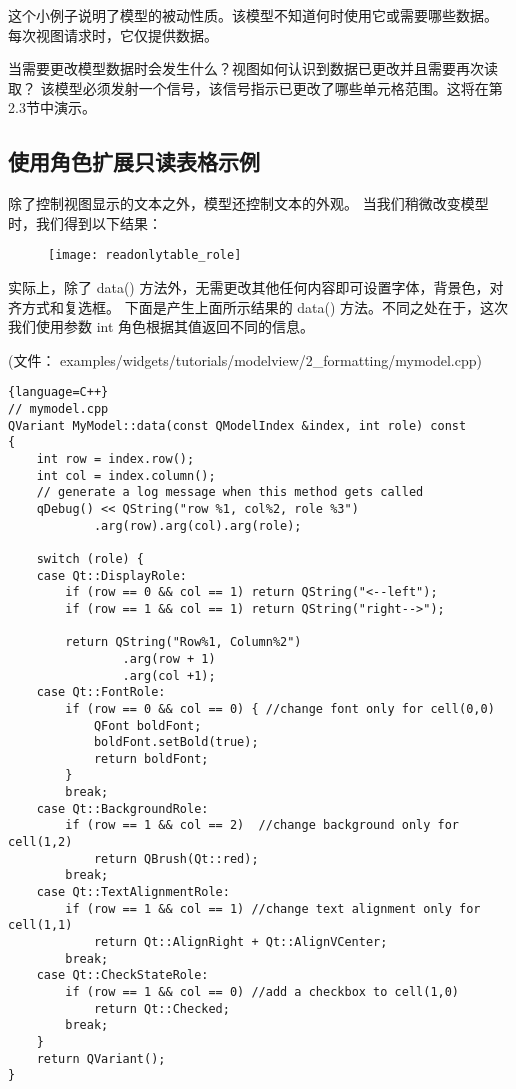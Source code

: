 这个小例子说明了模型的被动性质。该模型不知道何时使用它或需要哪些数据。
每次视图请求时，它仅提供数据。

当需要更改模型数据时会发生什么？视图如何认识到数据已更改并且需要再次读取？
该模型必须发射一个信号，该信号指示已更改了哪些单元格范围。这将在第2.3节中演示。

\subsection{使用角色扩展只读表格示例}

除了控制视图显示的文本之外，模型还控制文本的外观。
当我们稍微改变模型时，我们得到以下结果：

\begin{figure}[hbt!]  
\texttt{[image: readonlytable\_role]}
\end{figure}

实际上，除了 data() 方法外，无需更改其他任何内容即可设置字体，背景色，对齐方式和复选框。
下面是产生上面所示结果的 data() 方法。不同之处在于，这次我们使用参数 int 角色根据其值返回不同的信息。

(文件： examples/widgets/tutorials/modelview/2\_formatting/mymodel.cpp)

\begin{lstlisting}{language=C++}
// mymodel.cpp
QVariant MyModel::data(const QModelIndex &index, int role) const
{
    int row = index.row();
    int col = index.column();
    // generate a log message when this method gets called
    qDebug() << QString("row %1, col%2, role %3")
            .arg(row).arg(col).arg(role);

    switch (role) {
    case Qt::DisplayRole:
        if (row == 0 && col == 1) return QString("<--left");
        if (row == 1 && col == 1) return QString("right-->");

        return QString("Row%1, Column%2")
                .arg(row + 1)
                .arg(col +1);
    case Qt::FontRole:
        if (row == 0 && col == 0) { //change font only for cell(0,0)
            QFont boldFont;
            boldFont.setBold(true);
            return boldFont;
        }
        break;
    case Qt::BackgroundRole:
        if (row == 1 && col == 2)  //change background only for cell(1,2)
            return QBrush(Qt::red);
        break;
    case Qt::TextAlignmentRole:
        if (row == 1 && col == 1) //change text alignment only for cell(1,1)
            return Qt::AlignRight + Qt::AlignVCenter;
        break;
    case Qt::CheckStateRole:
        if (row == 1 && col == 0) //add a checkbox to cell(1,0)
            return Qt::Checked;
        break;
    }
    return QVariant();
}
\end{lstlisting}

